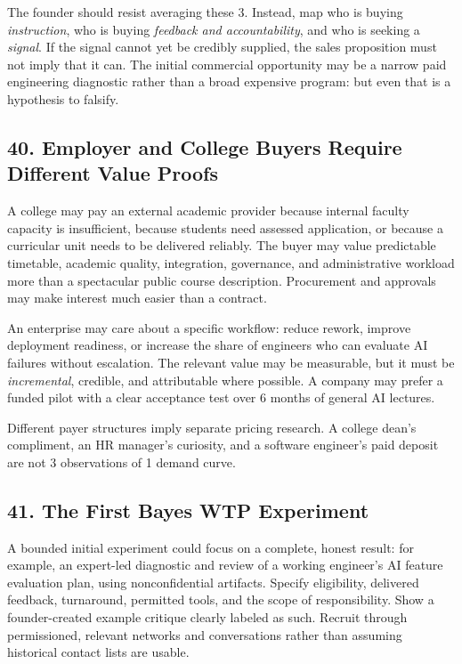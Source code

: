 The founder should resist averaging these 3. Instead, map who is buying \emph{instruction}, who is buying \emph{feedback and accountability}, and who is seeking a \emph{signal}. If the signal cannot yet be credibly supplied, the sales proposition must not imply that it can. The initial commercial opportunity may be a narrow paid engineering diagnostic rather than a broad expensive program: but even that is a hypothesis to falsify.

\subsection*{40. Employer and College Buyers Require Different Value Proofs}

A college may pay an external academic provider because internal faculty capacity is insufficient, because students need assessed application, or because a curricular unit needs to be delivered reliably. The buyer may value predictable timetable, academic quality, integration, governance, and administrative workload more than a spectacular public course description. Procurement and approvals may make interest much easier than a contract.

An enterprise may care about a specific workflow: reduce rework, improve deployment readiness, or increase the share of engineers who can evaluate AI failures without escalation. The relevant value may be measurable, but it must be \emph{incremental}, credible, and attributable where possible. A company may prefer a funded pilot with a clear acceptance test over 6 months of general AI lectures.

Different payer structures imply separate pricing research. A college dean's compliment, an HR manager's curiosity, and a software engineer's paid deposit are not 3 observations of 1 demand curve.

\subsection*{41. The First Bayes WTP Experiment}

A bounded initial experiment could focus on a complete, honest result: for example, an expert-led diagnostic and review of a working engineer's AI feature evaluation plan, using nonconfidential artifacts. Specify eligibility, delivered feedback, turnaround, permitted tools, and the scope of responsibility. Show a founder-created example critique clearly labeled as such. Recruit through permissioned, relevant networks and conversations rather than assuming historical contact lists are usable.

